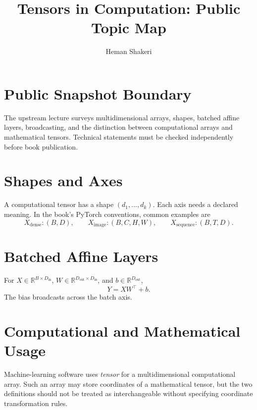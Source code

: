 \documentclass{article}
\title{Tensors in Computation: Public Topic Map}
\author{Heman Shakeri}
\date{}
\begin{document}
\maketitle

\section*{Public Snapshot Boundary}

The upstream lecture surveys multidimensional arrays, shapes, batched affine layers,
broadcasting, and the distinction between computational arrays and mathematical
tensors. Technical statements must be checked independently before book publication.

\section{Shapes and Axes}

A computational tensor has a shape $(d_1,\ldots,d_k)$. Each axis needs a declared
meaning. In the book's PyTorch conventions, common examples are
\[
  X_{\mathrm{dense}}:(B,D),\qquad
  X_{\mathrm{image}}:(B,C,H,W),\qquad
  X_{\mathrm{sequence}}:(B,T,D).
\]

\section{Batched Affine Layers}

For $X\in\mathbb{R}^{B\times D_{\mathrm{in}}}$,
$W\in\mathbb{R}^{D_{\mathrm{out}}\times D_{\mathrm{in}}}$, and
$b\in\mathbb{R}^{D_{\mathrm{out}}}$,
\[
  Y=XW^\top+b.
\]
The bias broadcasts across the batch axis.

\section{Computational and Mathematical Usage}

Machine-learning software uses \emph{tensor} for a multidimensional computational
array. Such an array may store coordinates of a mathematical tensor, but the two
definitions should not be treated as interchangeable without specifying coordinate
transformation rules.

\end{document}
